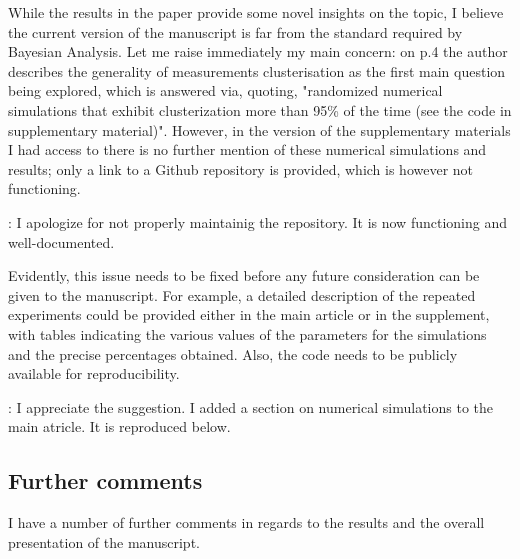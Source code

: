 \documentclass{amsart}
\begin{document}
While the results in the paper provide some novel insights on the
topic, I believe the current version of the manuscript is far from the
standard required by Bayesian Analysis. Let me raise immediately my
main concern: on p.4 the author describes the generality of
measurements clusterisation as the first main question being explored,
which is answered via, quoting, "randomized numerical simulations that
exhibit clusterization more than 95\% of the time (see the code in
supplementary material)". However, in the version of the supplementary
materials I had access to there is no further mention of these
numerical simulations and results; only a link to a Github repository
is provided, which is however not functioning.

\answer: I apologize for not properly maintainig the repository. It is
now functioning and well-documented.

Evidently, this issue needs to be fixed before any future
consideration can be given to the manuscript. For example, a detailed
description of the repeated experiments could be provided either in
the main article or in the supplement, with tables indicating the
various values of the parameters for the simulations and the precise
percentages obtained. Also, the code needs to be publicly available
for reproducibility.

\answer: I appreciate the suggestion. I added a section on numerical
simulations to the main atricle. It is reproduced below.



\subsection{Further comments}
I have a number of further comments in regards to the results and the
overall presentation of the manuscript.
\end{document}
